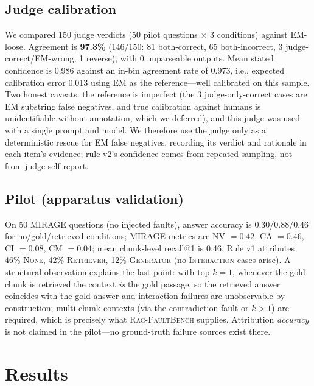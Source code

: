 \documentclass[conference]{IEEEtran}
\begin{document}
\subsection{Judge calibration}
\label{sec:judge}
We compared 150 judge verdicts (50 pilot questions $\times$ 3 conditions)
against EM-loose. Agreement is \textbf{97.3\%} (146/150: 81 both-correct, 65
both-incorrect, 3 judge-correct/EM-wrong, 1 reverse), with 0 unparseable
outputs. Mean stated confidence is 0.986 against an in-bin agreement rate of
0.973, i.e., expected calibration error 0.013 using EM as the
reference---well calibrated on this sample. Two honest caveats: the
reference is imperfect (the 3 judge-only-correct cases are EM substring
false negatives, and true calibration against humans is unidentifiable
without annotation, which we deferred), and this judge was used with a
single prompt and model. We therefore use the judge only as a deterministic
rescue for EM false negatives, recording its verdict and rationale in each
item's evidence; rule v2's confidence comes from repeated sampling, not from
judge self-report.

\subsection{Pilot (apparatus validation)}
\label{sec:pilot}
On 50 MIRAGE questions (no injected faults), answer accuracy is
0.30/0.88/0.46 for no/gold/retrieved conditions; MIRAGE metrics are
NV $=0.42$, CA $=0.46$, CI $=0.08$, CM $=0.04$; mean chunk-level recall@1 is
0.46. Rule v1 attributes 46\% \textsc{None}, 42\% \textsc{Retriever}, 12\%
\textsc{Generator} (no \textsc{Interaction} cases arise). A structural
observation explains the last point: with top-$k{=}1$, whenever the gold
chunk is retrieved the context \emph{is} the gold passage, so the retrieved
answer coincides with the gold answer and interaction failures are
unobservable by construction; multi-chunk contexts (via the contradiction
fault or $k{>}1$) are required, which is precisely what
\textsc{Rag-FaultBench} supplies. Attribution \emph{accuracy} is not claimed
in the pilot---no ground-truth failure sources exist there.

\section{Results}
\end{document}
